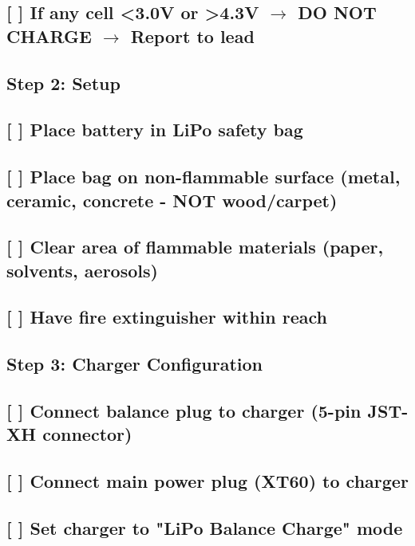 \documentclass[11pt,letterpaper]{article}
\begin{document}
\subsection*{[ ] If any cell <3.0V or >4.3V $\rightarrow$ DO NOT CHARGE $\rightarrow$ Report to lead}

\subsection*{Step 2: Setup}

\subsection*{[ ] Place battery in LiPo safety bag}

\subsection*{[ ] Place bag on non-flammable surface (metal, ceramic, concrete - NOT wood/carpet)}

\subsection*{[ ] Clear area of flammable materials (paper, solvents, aerosols)}

\subsection*{[ ] Have fire extinguisher within reach}

\subsection*{Step 3: Charger Configuration}

\subsection*{[ ] Connect balance plug to charger (5-pin JST-XH connector)}

\subsection*{[ ] Connect main power plug (XT60) to charger}

\subsection*{[ ] Set charger to "LiPo Balance Charge" mode}
\end{document}
